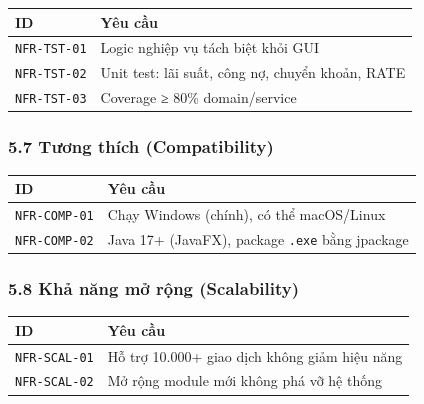\documentclass[11pt,a4paper]{article}
\newcounter{none}
\newcommand{\faintline}{%
  \noalign{\global\arrayrulecolor{faintgray}}%
  \hline
  \noalign{\global\arrayrulecolor{black}}%
} %
\begin{document}
{\def\LTcaptype{none}
\begin{longtable}[]{@{}
  >{\raggedright\arraybackslash}p{}
  >{\raggedright\arraybackslash}p{}@{}}
\toprule\noalign{}
ID & Yêu cầu \\
\midrule\noalign{}
\endhead
\bottomrule\noalign{}
\endlastfoot
\texttt{NFR-TST-01} & Logic nghiệp vụ tách biệt khỏi GUI \\ \faintline
\texttt{NFR-TST-02} & Unit test: lãi suất, công nợ, chuyển khoản, RATE \\ \faintline
\texttt{NFR-TST-03} & Coverage ≥ 80\% domain/service \\
\end{longtable}
}

\subsubsection{5.7 Tương thích (Compatibility)}\label{tux1b0ux1a1ng-thuxedch-compatibility}

{\def\LTcaptype{none}
\begin{longtable}[]{@{}
  >{\raggedright\arraybackslash}p{}
  >{\raggedright\arraybackslash}p{}@{}}
\toprule\noalign{}
ID & Yêu cầu \\
\midrule\noalign{}
\endhead
\bottomrule\noalign{}
\endlastfoot
\texttt{NFR-COMP-01} & Chạy Windows (chính), có thể macOS/Linux \\ \faintline
\texttt{NFR-COMP-02} & Java 17+ (JavaFX), package \texttt{.exe} bằng jpackage \\
\end{longtable}
}

\subsubsection{5.8 Khả năng mở rộng (Scalability)}\label{khux1ea3-nux103ng-mux1edf-rux1ed9ng-scalability}

{\def\LTcaptype{none}
\begin{longtable}[]{@{}
  >{\raggedright\arraybackslash}p{}
  >{\raggedright\arraybackslash}p{}@{}}
\toprule\noalign{}
ID & Yêu cầu \\
\midrule\noalign{}
\endhead
\bottomrule\noalign{}
\endlastfoot
\texttt{NFR-SCAL-01} & Hỗ trợ 10.000+ giao dịch không giảm hiệu năng \\ \faintline
\texttt{NFR-SCAL-02} & Mở rộng module mới không phá vỡ hệ thống \\
\end{longtable}
}
\end{document}
